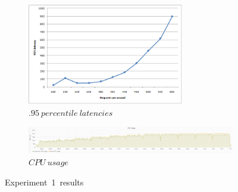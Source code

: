 \begin{figure}
\centering
\begin{subfigure}[b]{1\textwidth}
         \centering
         \includegraphics[width=0.75\textwidth]{Images/Results/Latencies-cas-li.png}
         \caption{$.95\ percentile\ latencies$}
         \label{fig:exp1lat}
\end{subfigure}
\hfill
\begin{subfigure}[b]{1\textwidth}
         \centering
         \includegraphics[width=\textwidth]{Images/Results/CPU-usage-cas-li.png}
         \caption{$CPU\ usage$}
         \label{fig:exp1cpu}
\end{subfigure}
\hfill
\label{figure:experiment1results}  
\caption{Experiment\ 1\ results}
\end{figure}